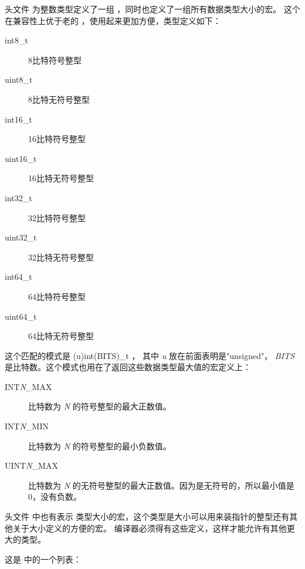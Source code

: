头文件  为整数类型定义了一组  ，同时也定义了一组所有数据类型大小的宏。 这个在兼容性上优于老的  ，使用起来更加方便，类型定义如下：

\begin{description}
\item[int8\_t] 8比特符号整型
\item[uint8\_t] 8比特无符号整型
\item[int16\_t] 16比特符号整型
\item[uint16\_t] 16比特无符号整型
\item[int32\_t] 32比特符号整型
\item[uint32\_t] 32比特无符号整型
\item[int64\_t] 64比特符号整型
\item[uint64\_t] 64比特无符号整型
\end{description}

这个匹配的模式是 (u)int(BITS)\_t ， 其中 \emph{u} 放在前面表明是"unsigned"，  \emph{BITS} 是比特数。这个模式也用在了返回这些数据类型最大值的宏定义上：

\begin{description}
\item[INT\emph{N}\_MAX] 比特数为 \emph{N} 的符号整型的最大正数值。
\item[INT\emph{N}\_MIN] 比特数为 \emph{N} 的符号整型的最小负数值。
\item[UINT\emph{N}\_MAX] 比特数为 \emph{N} 的无符号整型的最大正数值。因为是无符号的，所以最小值是0，没有负数。
\end{description}

头文件  中也有表示  类型大小的宏，这个类型是大小可以用来装指针的整型还有其他关于大小定义的方便的宏。
编译器必须得有这些定义，这样才能允许有其他更大的类型。


这是 中的一个列表：

